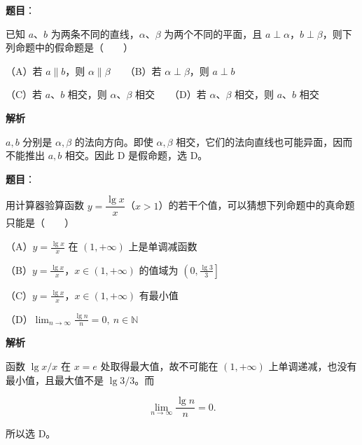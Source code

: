 \begin{answer}

\textbf{题目}：

已知 $a$、$b$ 为两条不同的直线，$\alpha$、$\beta$ 为两个不同的平面，且 $a\perp\alpha$，$b\perp\beta$，则下列命题中的假命题是\mbox{（　　）}

（A）若 $a\parallel b$，则 $\alpha\parallel\beta$　　（B）若 $\alpha\perp\beta$，则 $a\perp b$

（C）若 $a$、$b$ 相交，则 $\alpha$、$\beta$ 相交　　（D）若 $\alpha$、$\beta$ 相交，则 $a$、$b$ 相交

\textbf{解析}

$a,b$ 分别是 $\alpha,\beta$ 的法向方向。即使 $\alpha,\beta$ 相交，它们的法向直线也可能异面，因而不能推出 $a,b$ 相交。因此 D 是假命题，选 D。


\end{answer}
\begin{answer}

\textbf{题目}：

用计算器验算函数 $y=\dfrac{\lg x}{x}$（$x>1$）的若干个值，可以猜想下列命题中的真命题只能是\mbox{（　　）}

（A）$y=\frac{\lg x}{x}$ 在 $(1,+\infty)$ 上是单调减函数

（B）$y=\frac{\lg x}{x}$，$x\in(1,+\infty)$ 的值域为 $\left(0,\frac{\lg3}{3}\right]$

（C）$y=\frac{\lg x}{x}$，$x\in(1,+\infty)$ 有最小值

（D）$\displaystyle\lim_{n\to\infty}\frac{\lg n}{n}=0,\ n\in\mathbb N$

\textbf{解析}

函数 $\lg x/x$ 在 $x=e$ 处取得最大值，故不可能在 $(1,+\infty)$ 上单调递减，也没有最小值，且最大值不是 $\lg3/3$。而

\nopagebreak[4]
\[
\lim_{n\to\infty}\frac{\lg n}{n}=0.
\]

所以选 D。


\end{answer}

